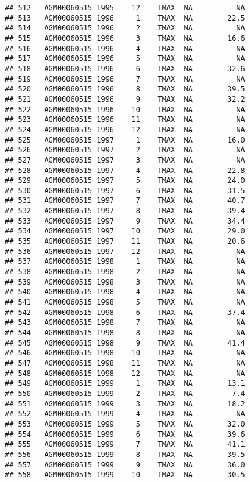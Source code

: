 \documentclass{article}\usepackage[]{graphicx}\usepackage[]{color}
\makeatletter
\newenvironment{kframe}{%
 \def\at@end@of@kframe{}%
 \ifinner\ifhmode%
  \def\at@end@of@kframe{\end{minipage}}%
  \begin{minipage}{\columnwidth}%
 \fi\fi%
 \def\FrameCommand##1{\hskip\@totalleftmargin \hskip-\fboxsep
 \colorbox{shadecolor}{##1}\hskip-\fboxsep
     \hskip-\linewidth \hskip-\@totalleftmargin \hskip\columnwidth}%
 \MakeFramed {\advance\hsize-\width
   \@totalleftmargin\z@ \linewidth\hsize
   \@setminipage}}%
 {\par\unskip\endMakeFramed%
 \at@end@of@kframe}
\newenvironment{knitrout}{}{} %
\makeatother
\begin{document}
\begin{knitrout}
\begin{kframe}
\begin{verbatim}
## 512   AGM00060515 1995    12    TMAX  NA          NA
## 513   AGM00060515 1996     1    TMAX  NA        22.5
## 514   AGM00060515 1996     2    TMAX  NA          NA
## 515   AGM00060515 1996     3    TMAX  NA        16.6
## 516   AGM00060515 1996     4    TMAX  NA          NA
## 517   AGM00060515 1996     5    TMAX  NA          NA
## 518   AGM00060515 1996     6    TMAX  NA        32.6
## 519   AGM00060515 1996     7    TMAX  NA          NA
## 520   AGM00060515 1996     8    TMAX  NA        39.5
## 521   AGM00060515 1996     9    TMAX  NA        32.2
## 522   AGM00060515 1996    10    TMAX  NA          NA
## 523   AGM00060515 1996    11    TMAX  NA          NA
## 524   AGM00060515 1996    12    TMAX  NA          NA
## 525   AGM00060515 1997     1    TMAX  NA        16.0
## 526   AGM00060515 1997     2    TMAX  NA          NA
## 527   AGM00060515 1997     3    TMAX  NA          NA
## 528   AGM00060515 1997     4    TMAX  NA        22.8
## 529   AGM00060515 1997     5    TMAX  NA        24.0
## 530   AGM00060515 1997     6    TMAX  NA        31.5
## 531   AGM00060515 1997     7    TMAX  NA        40.7
## 532   AGM00060515 1997     8    TMAX  NA        39.4
## 533   AGM00060515 1997     9    TMAX  NA        34.4
## 534   AGM00060515 1997    10    TMAX  NA        29.0
## 535   AGM00060515 1997    11    TMAX  NA        20.6
## 536   AGM00060515 1997    12    TMAX  NA          NA
## 537   AGM00060515 1998     1    TMAX  NA          NA
## 538   AGM00060515 1998     2    TMAX  NA          NA
## 539   AGM00060515 1998     3    TMAX  NA          NA
## 540   AGM00060515 1998     4    TMAX  NA          NA
## 541   AGM00060515 1998     5    TMAX  NA          NA
## 542   AGM00060515 1998     6    TMAX  NA        37.4
## 543   AGM00060515 1998     7    TMAX  NA          NA
## 544   AGM00060515 1998     8    TMAX  NA          NA
## 545   AGM00060515 1998     9    TMAX  NA        41.4
## 546   AGM00060515 1998    10    TMAX  NA          NA
## 547   AGM00060515 1998    11    TMAX  NA          NA
## 548   AGM00060515 1998    12    TMAX  NA          NA
## 549   AGM00060515 1999     1    TMAX  NA        13.1
## 550   AGM00060515 1999     2    TMAX  NA         7.4
## 551   AGM00060515 1999     3    TMAX  NA        18.2
## 552   AGM00060515 1999     4    TMAX  NA          NA
## 553   AGM00060515 1999     5    TMAX  NA        32.0
## 554   AGM00060515 1999     6    TMAX  NA        39.6
## 555   AGM00060515 1999     7    TMAX  NA        41.1
## 556   AGM00060515 1999     8    TMAX  NA        39.5
## 557   AGM00060515 1999     9    TMAX  NA        36.0
## 558   AGM00060515 1999    10    TMAX  NA        30.5

\end{verbatim}
\end{kframe}
\end{knitrout}
\end{document}
